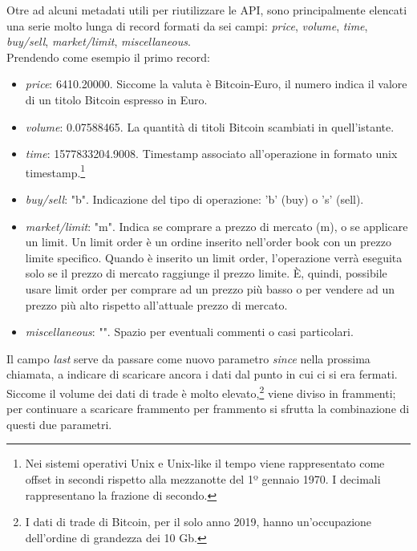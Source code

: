 \documentclass[a4paper,12pt]{report}
\begin{document}
\begin{itemize}
	Otre ad alcuni metadati utili per riutilizzare le API, sono principalmente elencati una serie molto lunga di record formati da sei campi: \textit{price}, \textit{volume}, \textit{time}, \textit{buy/sell}, \textit{market/limit}, \textit{miscellaneous}.\\ Prendendo come esempio il primo record:
	\begin{itemize}
		\item \textit{price}: 6410.20000. Siccome la valuta è Bitcoin-Euro, il numero indica il valore di un titolo Bitcoin espresso in Euro.
		\item \textit{volume}: 0.07588465. La quantità di titoli Bitcoin scambiati in quell'istante.
		\item \textit{time}: 1577833204.9008. Timestamp associato all'operazione in formato unix timestamp.\footnote{Nei sistemi operativi Unix e Unix-like il tempo viene rappresentato come offset in secondi rispetto alla mezzanotte del 1º gennaio 1970. I decimali rappresentano la frazione di secondo.}
		\item \textit{buy/sell}: "b". Indicazione del tipo di operazione: 'b' (buy) o 's' (sell).
		\item \textit{market/limit}: "m". Indica se comprare a prezzo di mercato (m), o se applicare un limit. Un limit order è un ordine inserito nell’order book con un prezzo limite specifico. Quando è inserito un limit order, l’operazione verrà eseguita solo se il prezzo di mercato raggiunge il prezzo limite. È, quindi, possibile usare limit order per comprare ad un prezzo più basso o per vendere ad un prezzo più alto rispetto all’attuale prezzo di mercato.
		\item \textit{miscellaneous}: "". Spazio per eventuali commenti o casi particolari.
	\end{itemize}
	
	
	Il campo \textit{last} serve da passare come nuovo parametro \textit{since} nella prossima chiamata, a indicare di scaricare ancora i dati dal punto in cui ci si era fermati. Siccome il volume dei dati di trade è molto elevato,\footnote{I dati di trade di Bitcoin, per il solo anno 2019, hanno un'occupazione dell'ordine di grandezza dei 10 Gb.} viene diviso in frammenti; per continuare a scaricare frammento per frammento si sfrutta la combinazione di questi due parametri.
	

\end{itemize}
\end{document}
